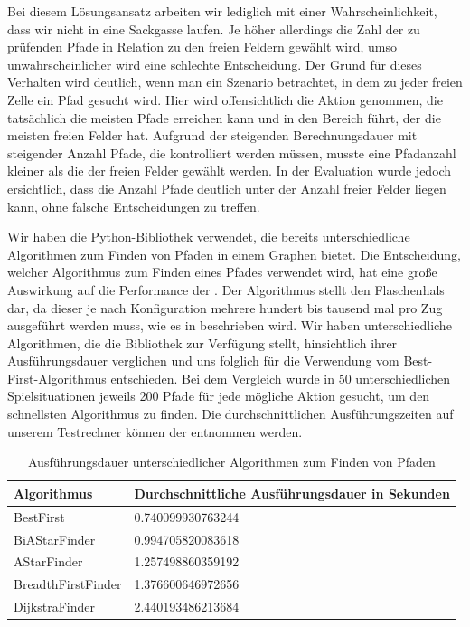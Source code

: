 Bei diesem Lösungsansatz arbeiten wir lediglich mit einer Wahrscheinlichkeit, dass wir nicht in eine Sackgasse laufen.
Je höher allerdings die Zahl der zu prüfenden Pfade in Relation zu den freien Feldern gewählt wird, umso
unwahrscheinlicher wird eine schlechte Entscheidung.
Der Grund für dieses Verhalten wird deutlich, wenn man ein Szenario betrachtet, in dem zu jeder freien Zelle ein Pfad
gesucht wird.
Hier wird offensichtlich die Aktion genommen, die tatsächlich die meisten Pfade erreichen kann und in den Bereich
führt, der die meisten freien Felder hat.
Aufgrund der steigenden Berechnungsdauer mit steigender Anzahl Pfade, die kontrolliert werden müssen, musste eine
Pfadanzahl kleiner als die der freien Felder gewählt werden.
In der Evaluation wurde jedoch ersichtlich, dass die Anzahl Pfade deutlich unter der Anzahl freier Felder liegen kann,
ohne falsche Entscheidungen zu treffen. 

Wir haben die Python-Bibliothek   verwendet, die bereits unterschiedliche
Algorithmen zum Finden von Pfaden in einem Graphen bietet.
Die Entscheidung, welcher Algorithmus zum Finden eines Pfades verwendet wird, hat eine große Auswirkung auf die
Performance der .
Der Algorithmus stellt den Flaschenhals dar, da dieser je nach Konfiguration mehrere hundert bis tausend mal pro
Zug ausgeführt werden muss, wie es \bspw in  beschrieben wird.
Wir haben unterschiedliche Algorithmen, die die Bibliothek zur Verfügung stellt, hinsichtlich ihrer Ausführungsdauer
verglichen und uns folglich für die Verwendung vom Best-First-Algorithmus entschieden.
Bei dem Vergleich wurde in 50 unterschiedlichen Spielsituationen jeweils 200 Pfade für jede mögliche Aktion gesucht, um
den schnellsten Algorithmus zu finden.
Die durchschnittlichen Ausführungszeiten auf unserem Testrechner können der
 entnommen werden.

\begin{table}[htb]
    \centering
    \begin{tabular}{|l|l|}
        \hline
            \textbf{Algorithmus} & {\textbf{Durchschnittliche Ausführungsdauer in Sekunden}} \\ \hline
            BestFirst 		    & 0.740099930763244 \\ \hline
            BiAStarFinder 		& 0.994705820083618 \\ \hline
            AStarFinder 		& 1.257498860359192 \\ \hline
            BreadthFirstFinder  & 1.376600646972656 \\ \hline
            DijkstraFinder		& 2.440193486213684 \\ \hline
    \end{tabular}
    \caption{Ausführungsdauer unterschiedlicher Algorithmen zum Finden von Pfaden}
    \label{tab:ausfuehrungsdauer-pfadalgorithmen}
\end{table}

